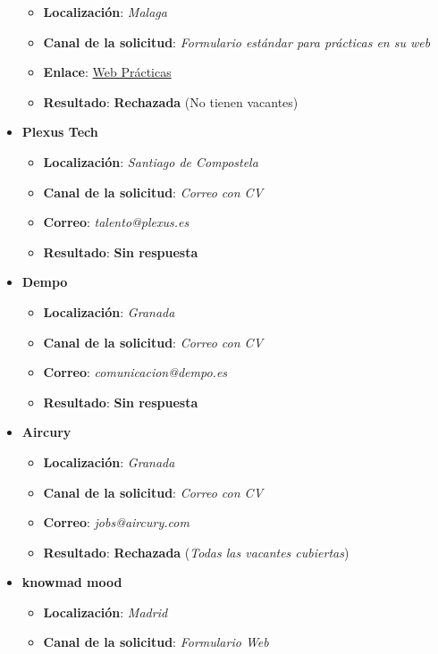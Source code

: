 \begin{itemize}
\begin{itemize}
		\item \textbf{Localización}: \textit{Malaga}
		\item \textbf{Canal de la solicitud}: \textit{Formulario estándar para prácticas en su web}
		\item \textbf{Enlace}: \href{https://www.accenture.com/es-es/careers/life-at-accenture/internships-careers}{Web Prácticas}
		\item \textbf{Resultado}: {\color{red} \textbf{Rechazada}} (No tienen vacantes)
	\end{itemize}
		\item \textbf{Plexus Tech}
	\begin{itemize}
		\item \textbf{Localización}: \textit{Santiago de Compostela}
		\item \textbf{Canal de la solicitud}: \textit{Correo con CV}
		\item \textbf{Correo}: \textit{talento@plexus.es}
		\item \textbf{Resultado}: {\color{orange} \textbf{Sin respuesta}}
	\end{itemize}
	\item \textbf{Dempo}
	\begin{itemize}
		\item \textbf{Localización}: \textit{Granada}
		\item \textbf{Canal de la solicitud}: \textit{Correo con CV}
		\item \textbf{Correo}: \textit{comunicacion@dempo.es}
		\item \textbf{Resultado}: {\color{orange} \textbf{Sin respuesta}}
	\end{itemize}
		\item \textbf{Aircury}
	\begin{itemize}
		\item \textbf{Localización}: \textit{Granada}
		\item \textbf{Canal de la solicitud}: \textit{Correo con CV}
		\item \textbf{Correo}: \textit{jobs@aircury.com}
		\item \textbf{Resultado}: {\color{red}\textbf{Rechazada}} (\textit{Todas las vacantes cubiertas})
	\end{itemize}
	\item \textbf{knowmad mood}
	\begin{itemize}
		\item \textbf{Localización}: \textit{Madrid}
		\item \textbf{Canal de la solicitud}: \textit{Formulario Web}

\end{itemize}
\end{itemize}
